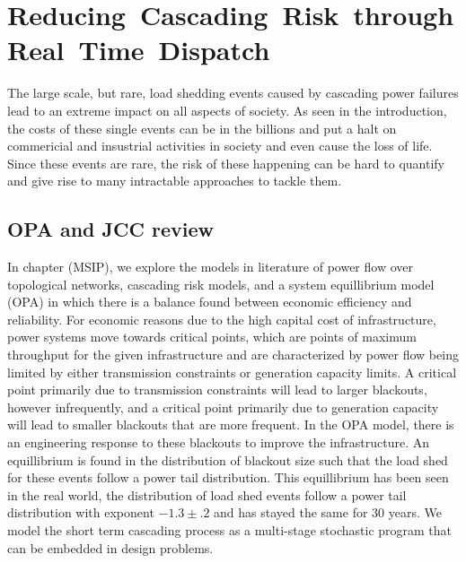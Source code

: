 \newcommand{\mypathoj}{../thesis/oj}

\newcommand{\mypathojdata}{../thesis/oj/data}
\newcommand{\alert}[1]{#1}
%
\chapter{Reducing~Cascading~Risk~through  Real~Time~Dispatch}

The large scale, but rare, load shedding events caused by cascading power failures lead to an extreme impact on all aspects of society.  As seen in the introduction, the costs of these single events can be in the billions and put a halt on commericial and insustrial activities in society and even cause the loss of life.  Since these events are rare, the risk of these happening can be hard to quantify and give rise to many intractable approaches to tackle them.  

\section{OPA and JCC review}
In chapter (MSIP), we explore the models in literature of power flow over topological networks, cascading risk models, and a system equillibrium model (OPA) in which there is a balance found between economic efficiency and reliability.  For economic reasons due to the high capital cost of infrastructure, power systems move towards critical points, which are points of maximum throughput for the given infrastructure and are characterized by power flow being limited by either transmission constraints or generation capacity limits.  A critical point primarily due to transmission constraints will lead to larger blackouts, however infrequently, and a critical point primarily due to generation capacity will lead to smaller blackouts that are more frequent.  In the OPA model, there is an engineering response to these blackouts to improve the infrastructure.  An equillibrium is found in the distribution of blackout size such that the load shed for these events follow a power tail distribution.  This equillibrium has been seen in the real world, the distribution of load shed events follow a power tail distribution with exponent $-1.3 \pm .2$ and has stayed the same for 30 years.  We model the short term cascading process as a multi-stage stochastic program that can be embedded in design problems.

